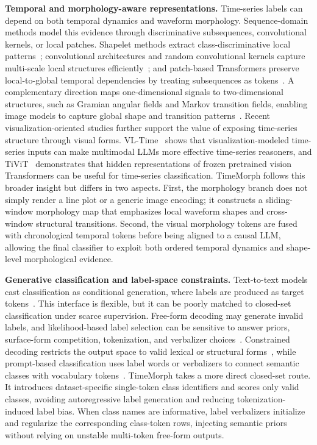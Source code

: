 \documentclass[10pt,journal,compsoc]{IEEEtran}
\begin{document}
\noindent\textbf{Temporal and morphology-aware representations.}
Time-series labels can depend on both temporal dynamics and waveform morphology. Sequence-domain methods model this evidence through discriminative subsequences, convolutional kernels, or local patches. Shapelet methods extract class-discriminative local patterns~\cite{ye2009shapelets,tang2020dpsn}; convolutional architectures and random convolutional kernels capture multi-scale local structures efficiently~\cite{fawaz2020inceptiontime,dempster2020rocket}; and patch-based Transformers preserve local-to-global temporal dependencies by treating subsequences as tokens~\cite{nie2023patchtst}. A complementary direction maps one-dimensional signals to two-dimensional structures, such as Gramian angular fields and Markov transition fields, enabling image models to capture global shape and transition patterns~\cite{wang2015imaging}. Recent visualization-oriented studies further support the value of exposing time-series structure through visual forms. VL-Time~\cite{liu2025vltime} shows that visualization-modeled time-series inputs can make multimodal LLMs more effective time-series reasoners, and TiViT~\cite{roschmann2025tivit} demonstrates that hidden representations of frozen pretrained vision Transformers can be useful for time-series classification. TimeMorph follows this broader insight but differs in two aspects. First, the morphology branch does not simply render a line plot or a generic image encoding; it constructs a sliding-window morphology map that emphasizes local waveform shapes and cross-window structural transitions. Second, the visual morphology tokens are fused with chronological temporal tokens before being aligned to a causal LLM, allowing the final classifier to exploit both ordered temporal dynamics and shape-level morphological evidence.

\noindent\textbf{Generative classification and label-space constraints.}
Text-to-text models cast classification as conditional generation, where labels are produced as target tokens~\cite{raffel2020t5}. This interface is flexible, but it can be poorly matched to closed-set classification under scarce supervision. Free-form decoding may generate invalid labels, and likelihood-based label selection can be sensitive to answer priors, surface-form competition, tokenization, and verbalizer choices~\cite{zhao2021calibrate,holtzman2021surface}. Constrained decoding restricts the output space to valid lexical or structural forms~\cite{balakrishnan2019constrained,geng2023grammar}, while prompt-based classification uses label words or verbalizers to connect semantic classes with vocabulary tokens~\cite{schick2021exploiting,gao2021lmbff}. TimeMorph takes a more direct closed-set route. It introduces dataset-specific single-token class identifiers and scores only valid classes, avoiding autoregressive label generation and reducing tokenization-induced label bias. When class names are informative, label verbalizers initialize and regularize the corresponding class-token rows, injecting semantic priors without relying on unstable multi-token free-form outputs.
\end{document}
